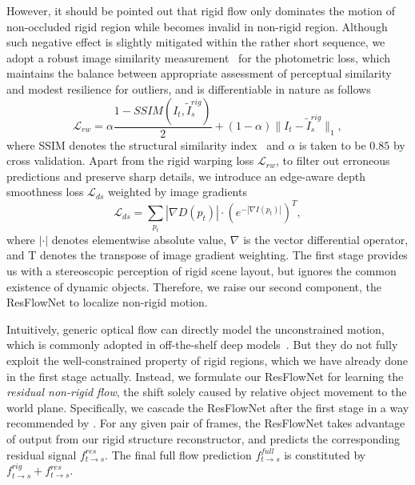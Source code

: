 \documentclass[10pt,twocolumn,letterpaper]{article}
\newcommand{\jpshi}[1]{{{\color{blue} Jianping: #1}}}
\begin{document}
However, it should be pointed out that rigid flow only dominates the motion of non-occluded rigid region while becomes invalid in non-rigid region. Although such negative effect is slightly mitigated within the rather short sequence, we adopt a robust image similarity measurement~\cite{monodepth17} for the photometric loss, which maintains the balance between appropriate assessment of perceptual similarity and modest resilience for outliers, and is differentiable in nature as follows
\begin{equation}
    \label{equa::ssim}
\mathcal{L}_{rw}=\alpha\frac{1-SSIM(I_t,\tilde{I}_s^{rig})}{2}+(1-\alpha)\|I_t-\tilde{I}_s^{rig}\|_1,
\end{equation}%
where SSIM denotes the structural similarity index~\cite{wang2004image} and $\alpha$ is taken to be $0.85$ by cross validation. %
Apart from the rigid warping loss $\mathcal{L}_{rw}$, to filter out erroneous predictions and preserve sharp details, we introduce an edge-aware depth smoothness loss $\mathcal{L}_{ds}$ weighted by image gradients
\begin{equation}
    \label{equa::smooth}
\mathcal{L}_{ds}=\sum_{p_t}|\nabla D(p_t)|\cdot (e^{-|\nabla I(p_t)|})^T,
\end{equation}
where $|\cdot|$ denotes elementwise absolute value, $\nabla$ is the vector differential operator, and T denotes the transpose of image gradient weighting.
The first stage provides us with a stereoscopic perception of rigid scene layout, but ignores the common existence of dynamic objects. Therefore, we raise our second component, \ie the ResFlowNet to localize non-rigid motion. 

Intuitively, generic optical flow can directly model the unconstrained motion, which is commonly adopted in off-the-shelf deep models~\cite{FischerDIHHGSCB15,IMKDB17}. But they do not fully exploit the well-constrained property of rigid regions, which we have already done in the first stage actually. Instead, we formulate our ResFlowNet for learning the \textit{residual non-rigid flow}, the shift solely caused by relative object movement to the world plane. Specifically, we cascade the ResFlowNet after the first stage in a way recommended by \cite{IMKDB17}. For any given pair of frames, the ResFlowNet takes advantage of output from our rigid structure reconstructor, and predicts the corresponding residual signal $f^{res}_{t\to s}$. The final full flow prediction $f^{full}_{t\to s}$ is constituted by $f^{rig}_{t\to s}+f^{res}_{t\to s}$. 
\end{document}

